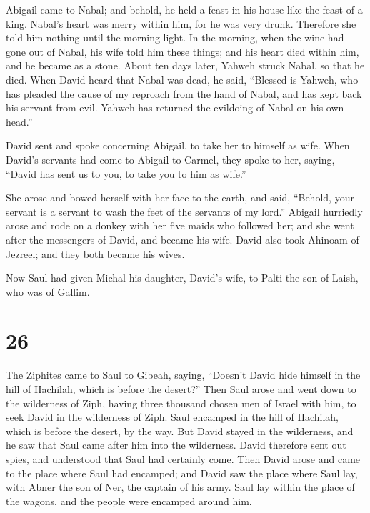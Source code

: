  Abigail came to Nabal; and behold, he held a feast in
his house like the feast of a king. Nabal's heart was merry within him,
for he was very drunk. Therefore she told him nothing until the morning
light.  In the morning, when the wine had gone out of
Nabal, his wife told him these things; and his heart died within him,
and he became as a stone.  About ten days later, Yahweh
struck Nabal, so that he died.  When David heard that
Nabal was dead, he said, ``Blessed is Yahweh, who has pleaded the cause
of my reproach from the hand of Nabal, and has kept back his servant
from evil. Yahweh has returned the evildoing of Nabal on his own head.''

David sent and spoke concerning Abigail, to take her to himself as wife.
 When David's servants had come to Abigail to Carmel,
they spoke to her, saying, ``David has sent us to you, to take you to
him as wife.''

 She arose and bowed herself with her face to the earth,
and said, ``Behold, your servant is a servant to wash the feet of the
servants of my lord.''  Abigail hurriedly arose and rode
on a donkey with her five maids who followed her; and she went after the
messengers of David, and became his wife.  David also
took Ahinoam of Jezreel; and they both became his wives.

 Now Saul had given Michal his daughter, David's wife, to
Palti the son of Laish, who was of Gallim.

\hypertarget{section-25}{%
\section{26}\label{section-25}}

 The Ziphites came to Saul to Gibeah, saying, ``Doesn't
David hide himself in the hill of Hachilah, which is before the
desert?''  Then Saul arose and went down to the wilderness
of Ziph, having three thousand chosen men of Israel with him, to seek
David in the wilderness of Ziph.  Saul encamped in the
hill of Hachilah, which is before the desert, by the way. But David
stayed in the wilderness, and he saw that Saul came after him into the
wilderness.  David therefore sent out spies, and
understood that Saul had certainly come.  Then David arose
and came to the place where Saul had encamped; and David saw the place
where Saul lay, with Abner the son of Ner, the captain of his army. Saul
lay within the place of the wagons, and the people were encamped around
him.

